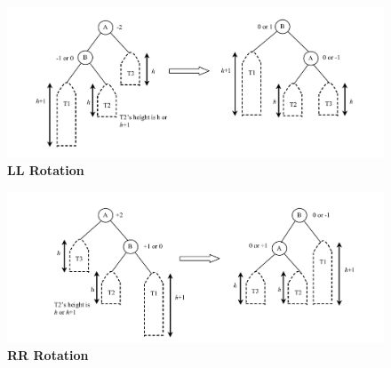 \documentclass{memoir}%
\begin{document}
\begin{vplace}

\begin{figure}[h]
\begin{center}
 \includegraphics[width=\textwidth]{ll.png}
 \textbf{LL Rotation}
\end{center}
\end{figure}

\begin{figure}[h]
\begin{center}
 \includegraphics[width=\textwidth]{rr.png}
 \textbf{RR Rotation}
\end{center}
\end{figure}

\end{vplace}
\end{document}
